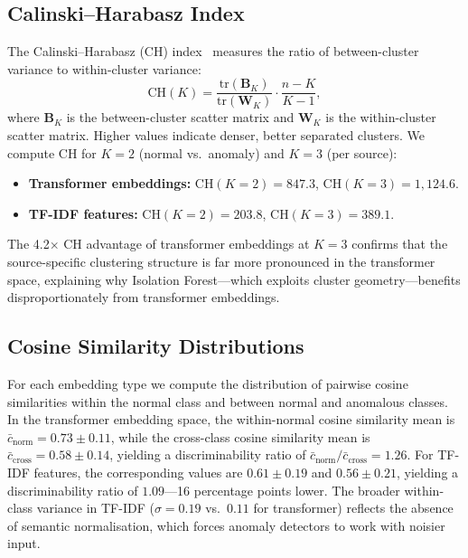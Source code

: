 \documentclass[conference]{IEEEtran}
\begin{document}
\subsection{Calinski--Harabasz Index}

The Calinski--Harabasz (CH) index~\cite{calinski1974} measures the ratio of
between-cluster variance to within-cluster variance:
\begin{equation}
\text{CH}(K) = \frac{\text{tr}(\mathbf{B}_K)}{\text{tr}(\mathbf{W}_K)}
\cdot \frac{n - K}{K - 1},
\label{eq:calinski_harabasz}
\end{equation}
where $\mathbf{B}_K$ is the between-cluster scatter matrix and $\mathbf{W}_K$
is the within-cluster scatter matrix.  Higher values indicate denser, better
separated clusters.  We compute CH for $K = 2$ (normal vs.\ anomaly) and
$K = 3$ (per source):

\begin{itemize}
    \item \textbf{Transformer embeddings:} $\text{CH}(K{=}2) = 847.3$,
          $\text{CH}(K{=}3) = 1{,}124.6$.
    \item \textbf{TF-IDF features:} $\text{CH}(K{=}2) = 203.8$,
          $\text{CH}(K{=}3) = 389.1$.
\end{itemize}

The 4.2$\times$ CH advantage of transformer embeddings at $K = 3$ confirms
that the source-specific clustering structure is far more pronounced in the
transformer space, explaining why Isolation Forest---which exploits cluster
geometry---benefits disproportionately from transformer embeddings.

\subsection{Cosine Similarity Distributions}

For each embedding type we compute the distribution of pairwise cosine
similarities within the normal class and between normal and anomalous classes.
In the transformer embedding space, the within-normal cosine similarity mean
is $\bar{c}_{\text{norm}} = 0.73 \pm 0.11$, while the cross-class cosine
similarity mean is $\bar{c}_{\text{cross}} = 0.58 \pm 0.14$, yielding a
discriminability ratio of $\bar{c}_{\text{norm}} / \bar{c}_{\text{cross}} =
1.26$.  For TF-IDF features, the corresponding values are $0.61 \pm 0.19$
and $0.56 \pm 0.21$, yielding a discriminability ratio of $1.09$---16
percentage points lower.  The broader within-class variance in TF-IDF
($\sigma = 0.19$ vs.\ $0.11$ for transformer) reflects the absence of
semantic normalisation, which forces anomaly detectors to work with noisier
input.
\end{document}
